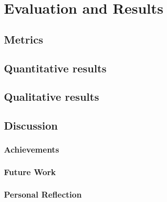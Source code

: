 \chapter{Evaluation and Results}
\label{EvaluationAndResults}

\section{Metrics}
\section{Quantitative results}
\section{Qualitative results}
\section{Discussion}
\subsection{Achievements}
\subsection{Future Work}
\subsection{Personal Reflection}